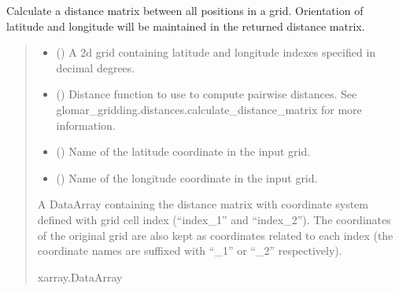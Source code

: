 \documentclass[letterpaper,10pt,english]{sphinxmanual}
\begin{document}
\begin{fulllineitems}
\label{\detokenize{covariance:glomar_gridding.grid.grid_to_distance_matrix}}
\pysigstartsignatures
\pysiglinewithargsret
{}
{\sphinxparamcomma {}\sphinxparamcomma {}\sphinxparamcomma {}}
{}
\pysigstopsignatures
\sphinxAtStartPar
Calculate a distance matrix between all positions in a grid. Orientation of
latitude and longitude will be maintained in the returned distance matrix.
\begin{quote}\begin{description}
\begin{itemize}
\item {}
\sphinxAtStartPar
{} () \textendash{} A 2\sphinxhyphen{}d grid containing latitude and longitude indexes specified in
decimal degrees.

\item {}
\sphinxAtStartPar
{} () \textendash{} Distance function to use to compute pairwise distances. See
glomar\_gridding.distances.calculate\_distance\_matrix for more
information.

\item {}
\sphinxAtStartPar
{} () \textendash{} Name of the latitude coordinate in the input grid.

\item {}
\sphinxAtStartPar
{} () \textendash{} Name of the longitude coordinate in the input grid.

\end{itemize}

\sphinxAtStartPar
{} \textendash{} A DataArray containing the distance matrix with coordinate system
defined with grid cell index (“index\_1” and “index\_2”). The coordinates
of the original grid are also kept as coordinates related to each
index (the coordinate names are suffixed with “\_1” or “\_2”
respectively).

\sphinxAtStartPar
xarray.DataArray

\end{description}\end{quote}

\end{fulllineitems}
\end{document}
